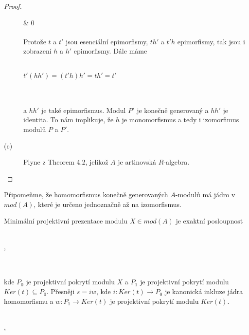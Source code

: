 \begin{proof}
\begin{description}
{{             & 0  
         }} \\\\ 
         Protože $t$ a $t'$ jsou esenciální epimorfismy, $th'$ a $t'h$ 
         epimorfismy, tak jsou i zobrazení $h$ a $h'$ epimorfismy. Dále máme \\\\
         \centerline{$t'(hh')=(t'h)h'=th'=t'$} 
         \\\\
         a $hh'$ je také epimorfismus. Modul $P'$ je konečně generovaný a $hh'$ 
         je identita. To nám implikuje, že $h$ je monomorfismus a tedy 
         i izomorfimus modulů $P$ a $P'$.
         \item[(c)] Plyne z \cite{2} Theorem 4.2, jelikož $A$ je artinovská $R$-algebra.
       \end{description} 
     \end{proof}
     
     \begin{pzn}
       Připomeňme, že homomorfismus konečně generovaných $A$-modulů má jádro v 
       $mod(A)$, které je určeno jednoznačně až na izomorfismus.
     \end{pzn}
     
     \begin{dfn}
       Minimální projektivní prezentace modulu $X\in mod(A)$ je exaktní 
       posloupnost 
      \\\\      
      \centerline{,}\\\\ 
      kde $P_0$ je projektivní pokrytí modulu $X$ a $P_1$ je projektivní 
      pokrytí modulu $Ker(t)\subseteq P_0$. Přesněji $s=iw$, kde $i:Ker(t)\rightarrow P_0$ 
      je kanonická inkluze jádra homomorfismu a $w:P_1\rightarrow Ker(t)$ je 
      projektivní pokrytí modulu $Ker(t)$.\\\\
       \centerline{,}
     \end{dfn}
     
